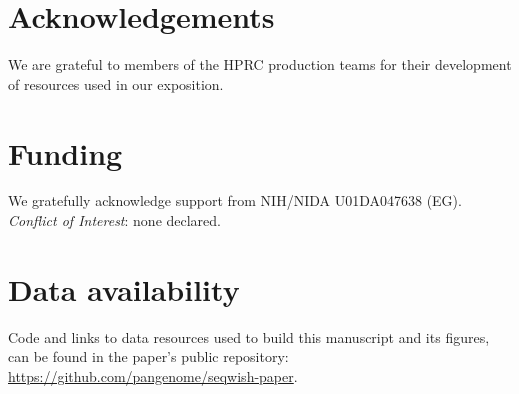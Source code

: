 \documentclass{bioinfo}
\theoremstyle{definition}
\begin{document}
\section*{Acknowledgements}

We are grateful to members of the HPRC production teams for their development of resources used in our exposition.

\section*{Funding}

We gratefully acknowledge support from NIH/NIDA U01DA047638 (EG).
\linebreak
\linebreak
\textit{Conflict of Interest}: none declared.

\section*{Data availability}

Code and links to data resources used to build this manuscript and its figures, can be found in the paper's public repository: \url{https://github.com/pangenome/seqwish-paper}.




\end{document}
